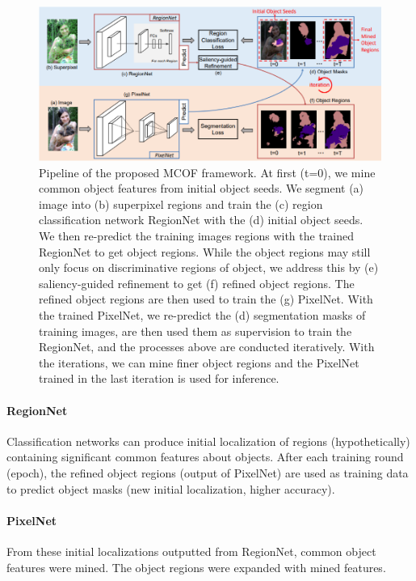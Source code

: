 \documentclass{article}
\begin{document}
\begin{figure}[ht]
	\centering
	\includegraphics[width=\textwidth]{ref3_image}
	\caption{Pipeline of the proposed MCOF framework. At first (t=0), we mine common object features from initial object seeds. We segment (a) image into (b) superpixel regions and train the (c) region classification network RegionNet with the (d) initial object seeds. We then re-predict the training images regions with the trained RegionNet to get object regions. While the object regions may still only focus on discriminative regions of object, we address this by (e) saliency-guided refinement to get (f) refined object regions. The refined object regions are then used to train the (g) PixelNet. With the trained PixelNet, we re-predict the (d) segmentation masks of training images, are then used them as supervision to train the RegionNet, and the processes above are conducted iteratively. With the iterations, we can mine finer object regions and the PixelNet trained in the last iteration is used for inference. \cite{Wang2018WeaklySupervisedSS}}
	\label{fig:ref3}
\end{figure}

\paragraph{RegionNet}
Classification networks can produce initial localization of regions (hypothetically) containing significant common features about objects. After each training round (epoch), the refined object regions (output of PixelNet) are used as training data to predict object masks (new initial localization, higher accuracy).

\paragraph{PixelNet}
From these initial localizations outputted from RegionNet, common object features were mined. The object regions were expanded with mined features. 
\end{document}
